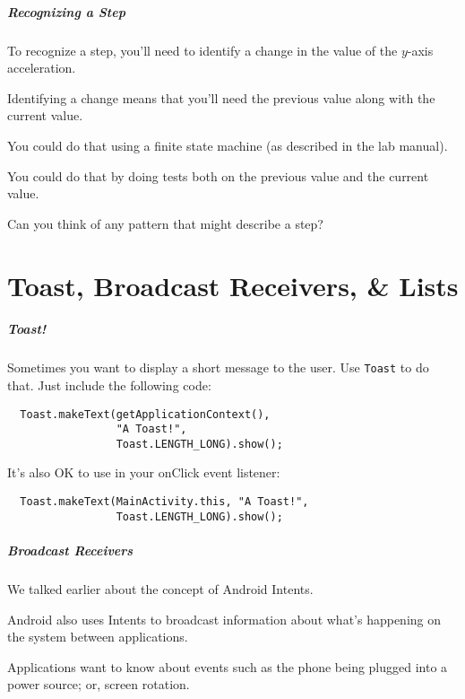 \begin{frame}
\frametitle{Recognizing a Step}
\begin{changemargin}{1cm}

To recognize a step, you'll need to identify a change in the value of the $y$-axis
acceleration. 

Identifying a change means that you'll need the previous value along
with the current value. 

You could do that using a finite state machine (as described
in the lab manual). 

You could do that by doing tests both on the previous value 
and the current value. 

Can you think of any pattern that might describe a step?

\end{changemargin}
\end{frame}


\part{Toast, Broadcast Receivers, \& Lists}
\frame{\partpage}

\begin{frame}[fragile]
\frametitle{Toast!}
\begin{changemargin}{1cm}

 Sometimes you want to display a short message to the user.
Use {\tt Toast} to do that. Just include the following code:
\begin{verbatim}
  Toast.makeText(getApplicationContext(), 
                 "A Toast!", 
                 Toast.LENGTH_LONG).show();
\end{verbatim}
It's also OK to use in your onClick event listener:
\begin{verbatim}
  Toast.makeText(MainActivity.this, "A Toast!", 
                 Toast.LENGTH_LONG).show();
\end{verbatim}


\end{changemargin}
\end{frame}


\begin{frame}
\frametitle{Broadcast Receivers}
\begin{changemargin}{1cm}

We talked earlier about the concept of Android Intents.

Android also uses Intents to broadcast information about what's
happening on the system between applications. 

Applications want to
know about events such as the phone being plugged into a power source;
or, screen rotation.


\end{changemargin}
\end{frame}

